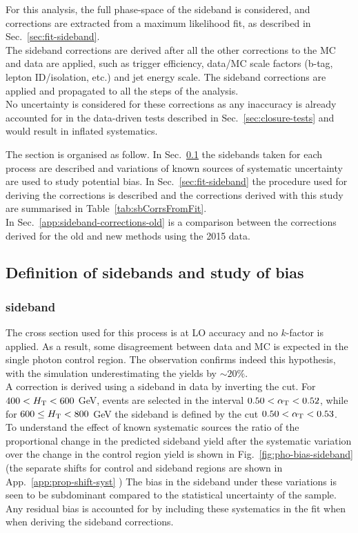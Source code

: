 For this analysis, the full phase-space of the sideband is considered, 
and corrections are extracted from a maximum likelihood fit, as described in Sec.~\ref{sec:fit-sideband}. \\
The sideband corrections are derived after all the other corrections to the MC and data are applied, 
such as trigger efficiency, data/MC scale factors (b-tag, lepton ID/isolation, etc.) and jet energy scale. 
The sideband corrections are applied and propagated to all the steps of the analysis.\\
No uncertainty is considered for these corrections as any inaccuracy is already accounted 
for in the data-driven tests described in Sec.~\ref{sec:closure-tests} and would result in inflated systematics. 

The section is organised as follow. 
In Sec.~\ref{sec:bias-study-sideband} the sidebands taken for each process are described and variations of known sources of 
systematic uncertainty are used to study potential bias. In Sec.~\ref{sec:fit-sideband} the procedure used for deriving
the corrections is described and the corrections derived with this study are summarised in Table~\ref{tab:sbCorrsFromFit}.\\
In Sec.~\ref{app:sideband-corrections-old} is a comparison 
between the corrections derived for the old and new methods using the 2015 data.

\subsection{Definition of sidebands and study of bias}
\label{sec:bias-study-sideband}
\subsubsection{\gj sideband}
The cross section used for this process is at LO accuracy and no $k$-factor is applied. 
As a result, some disagreement between data and MC is expected in the single photon control region.
The observation confirms indeed this hypothesis, with the simulation underestimating the yields by $\sim 20\%$. \\
A correction is derived using a sideband in data by inverting the \alphat cut. 
For $400 < \mbox{$H_\text{T}$} < 600$ GeV, events are selected in the interval $0.50 < \alpha_{\text{T}} < 0.52$, 
while for $600 \leq \mbox{$H_\text{T}$} < 800$ GeV the sideband is defined by the cut $0.50 < \alpha_{\text{T}} < 0.53$. \\
To understand the effect of known systematic sources the ratio of the proportional change in the
predicted sideband yield after the systematic variation over the change in the control region yield is shown in 
Fig.~\ref{fig:pho-bias-sideband} (the separate shifts for control and sideband regions are shown in
App.~\ref{app:prop-shift-syst} )
The bias in the sideband under these variations is seen to be
subdominant compared to the statistical uncertainty of the sample.
Any residual bias is accounted for by including these systematics 
in the fit when when deriving the sideband corrections.

